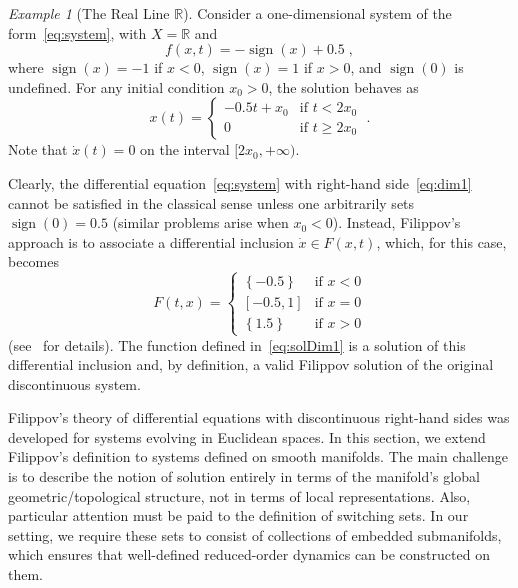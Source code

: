 \documentclass{article}
\theoremstyle{definition}
\theoremstyle{remark}
\newtheorem{example}{Example}
\newcommand{\MA}{X}	%
\newcommand{\RR}{\mathbb{R}}	%
\DeclareMathOperator{\sign}{sign}
\begin{document}
\begin{example}[The Real Line $\RR$] \label{exa:dim1}
 Consider a one-dimensional system of the form~\eqref{eq:system}, with $\MA = \RR$ and
 \begin{equation} \label{eq:dim1}
  f(x, t) = -\sign(x) + 0.5 \;,
 \end{equation}
 where $\sign(x) = -1$ if $x < 0$, $\sign(x) = 1$ if $x > 0$, and $\sign(0)$ is undefined. For any initial
 condition $x_0 > 0$, the solution behaves as
 \begin{equation} \label{eq:solDim1}
  x(t) =
  \begin{cases}
   -0.5 t + x_0 & \text{if $t < 2x_0$} \\
              0 & \text{if $t \ge 2x_0$} 
  \end{cases} \;.
 \end{equation}
 Note that $\dot{x}(t) = 0$ on the interval $[2x_0, +\infty)$.

 Clearly, the differential equation~\eqref{eq:system} with right-hand side~\eqref{eq:dim1} cannot be satisfied
 in the classical sense unless one arbitrarily sets $\sign(0) = 0.5$ (similar problems arise when $x_0 < 0$). Instead, Filippov's approach is to associate
 a differential inclusion $\dot{x} \in F(x,t)$, which, for this case, becomes
 \begin{equation} \label{eq:FDim1}
  F(t,x) = 
   \begin{cases}
    \left\{ -0.5 \right\} & \text{if $x < 0$} \\
                 [-0.5,1] & \text{if $x=0$} \\
     \left\{ 1.5 \right\} & \text{if $x > 0$}
   \end{cases} 
 \end{equation} 
 (see~\cite{filippov} for details). The function defined in~\eqref{eq:solDim1} is a solution of this differential
 inclusion and, by definition, a valid Filippov solution of the original discontinuous system.
\end{example}

Filippov's theory of differential equations with discontinuous right-hand sides was developed for systems
evolving in Euclidean spaces. In this section, we extend Filippov's definition to systems defined on smooth manifolds. 
The main challenge is to describe the notion of solution entirely in terms of the manifold's global
geometric/topological structure, not in terms of local representations. Also, particular attention must be paid to the definition
of switching sets. In our setting, we require these sets to consist of collections of embedded submanifolds, which ensures that
well-defined reduced-order dynamics can be constructed on them.
\end{document}
